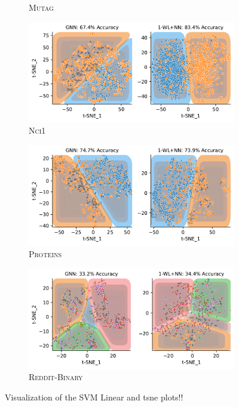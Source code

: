 \begin{figure}
\begin{subfigure}[b]{0.49\textwidth}
		\vspace*{-4ex} 
		\caption{\textsc{Mutag}}
	\end{subfigure}
	\hfill
	\begin{subfigure}[b]{0.49\textwidth}
		\centering
		\includegraphics[width=\textwidth]{Figures/tsne_svm_lin_NCI1.pdf}
		\vspace*{-4ex} 
		\caption{\textsc{Nci1}}
	\end{subfigure}
	\par\bigskip
	\begin{subfigure}[b]{0.49\textwidth}
		\centering
		\includegraphics[width=\textwidth]{Figures/tsne_svm_lin_PROTEINS.pdf}
		\vspace*{-4ex} 
		\caption{\textsc{Proteins}}
	\end{subfigure}
	\hfill
	\begin{subfigure}[b]{0.49\textwidth}
		\centering
		\includegraphics[width=\textwidth]{Figures/tsne_svm_lin_ENZYMES.pdf}
		\vspace*{-4ex} 
		\caption{\textsc{Reddit-Binary}}
	\end{subfigure}
	\caption{Visualization of the SVM Linear and tsne plots!!}
\end{figure}


